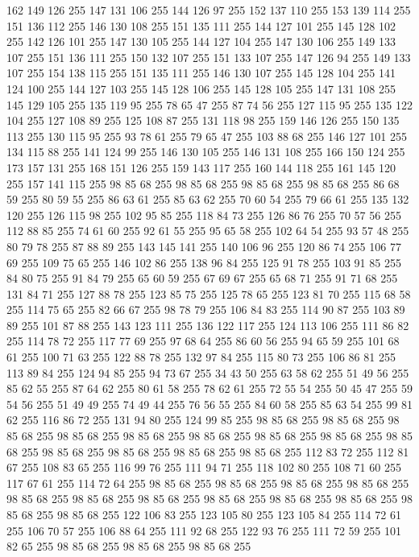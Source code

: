 162 149 126 255 147 131 106 255 144 126 97 255 152 137 110 255 153 139 114 255 151 136 112 255 146 130 108 255 151 135 111 255 144 127 101 255 145 128 102 255 142 126 101 255 147 130 105 255 144 127 104 255 147 130 106 255 149 133 107 255 151 136 111 255 150 132 107 255 151 133 107 255 147 126 94 255 149 133 107 255 154 138 115 255 151 135 111 255 146 130 107 255 145 128 104 255 141 124 100 255 144 127 103 255 145 128 106 255 145 128 105 255 147 131 108 255 145 129 105 255 135 119 95 255 78 65 47 255 87 74 56 255 127 115 95 255 135 122 104 255 127 108 89 255 125 108 87 255 131 118 98 255 159 146 126 255 150 135 113 255 130 115 95 255 93 78 61 255 79 65 47 255 103 88 68 255 146 127 101 255 134 115 88 255 141 124 99 255 146 130 105 255 146 131 108 255 166 150 124 255 173 157 131 255 168 151 126 255 159 143 117 255 160 144 118 255 161 145 120 255 157 141 115 255 98 85 68 255 98 85 68 255 98 85 68 255 98 85 68 255 86 68 59 255 80 59 55 255 86 63 61 255 85 63 62 255
70 60 54 255 79 66 61 255 135 132 120 255 126 115 98 255 102 95 85 255 118 84 73 255 126 86 76 255 70 57 56 255 112 88 85 255 74 61 60 255 92 61 55 255 95 65 58 255 102 64 54 255 93 57 48 255 80 79 78 255 87 88 89 255 143 145 141 255 140 106 96 255 120 86 74 255 106 77 69 255 109 75 65 255 146 102 86 255 138 96 84 255 125 91 78 255 103 91 85 255 84 80 75 255 91 84 79 255 65 60 59 255 67 69 67 255 65 68 71 255 91 71 68 255 131 84 71 255 127 88 78 255 123 85 75 255 125 78 65 255 123 81 70 255 115 68 58 255 114 75 65 255 82 66 67 255 98 78 79 255 106 84 83 255 114 90 87 255 103 89 89 255 101 87 88 255 143 123 111 255 136 122 117 255 124 113 106 255 111 86 82 255 114 78 72 255 117 77 69 255 97 68 64 255 86 60 56 255 94 65 59 255 101 68 61 255 100 71 63 255 122 88 78 255 132 97 84 255 115 80 73 255 106 86 81 255 113 89 84 255 124 94 85 255 94 73 67 255 34 43 50 255 63 58 62 255
51 49 56 255 85 62 55 255 87 64 62 255 80 61 58 255 78 62 61 255 72 55 54 255 50 45 47 255 59 54 56 255 51 49 49 255 74 49 44 255 76 56 55 255 84 60 58 255 85 63 54 255 99 81 62 255 116 86 72 255 131 94 80 255 124 99 85 255 98 85 68 255 98 85 68 255 98 85 68 255 98 85 68 255 98 85 68 255 98 85 68 255 98 85 68 255 98 85 68 255 98 85 68 255 98 85 68 255 98 85 68 255 98 85 68 255 98 85 68 255 112 83 72 255 112 81 67 255 108 83 65 255 116 99 76 255 111 94 71 255 118 102 80 255 108 71 60 255 117 67 61 255 114 72 64 255 98 85 68 255 98 85 68 255 98 85 68 255 98 85 68 255 98 85 68 255 98 85 68 255 98 85 68 255 98 85 68 255 98 85 68 255 98 85 68 255 98 85 68 255 98 85 68 255 122 106 83 255 123 105 80 255 123 105 84 255 114 72 61 255 106 70 57 255 106 88 64 255 111 92 68 255 122 93 76 255 111 72 59 255 101 82 65 255 98 85 68 255 98 85 68 255 98 85 68 255
